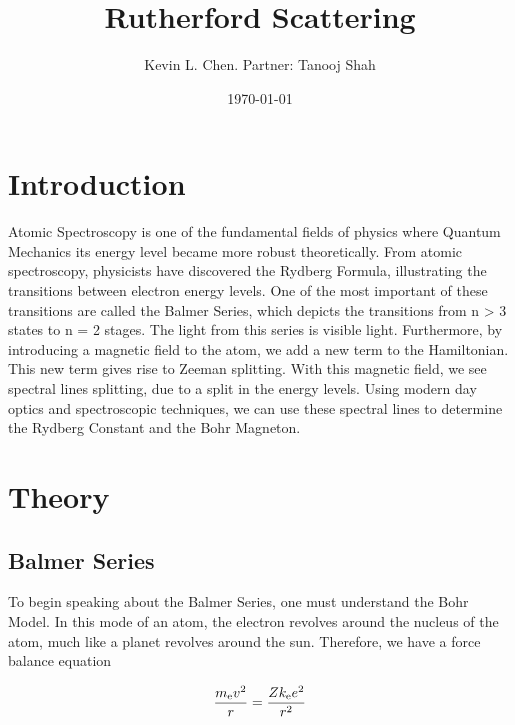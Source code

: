 \title{Rutherford Scattering}
\author         {Kevin L. Chen. Partner: Tanooj Shah}
\date{\today}

\begin{abstract}
\end{abstract}

\maketitle

\section{Introduction}

Atomic Spectroscopy is one of the fundamental fields of physics where Quantum Mechanics its energy level became more robust theoretically. From atomic spectroscopy, physicists have discovered the Rydberg Formula, illustrating the transitions between electron energy levels. One of the most important of these transitions are called the Balmer Series, which depicts the transitions from n > 3 states to n = 2 stages. The light from this series is visible light. Furthermore, by introducing a magnetic field to the atom, we add a new term to the Hamiltonian. This new term gives rise to Zeeman splitting. With this magnetic field, we see spectral lines splitting, due to a split in the energy levels. Using modern day optics and spectroscopic techniques, we can use these spectral lines to determine the Rydberg Constant and the Bohr Magneton. 
\section{Theory}
\subsection{Balmer Series}

To begin speaking about the Balmer Series, one must understand the Bohr Model. In this mode of an atom, the electron revolves around the nucleus of the atom, much like a planet revolves around the sun. Therefore, we have a force balance equation 

\begin{equation}
    {m_\mathrm{e} v^2\over r} = {Zk_\mathrm{e} e^2 \over r^2} 
   \label{Coulomb Force}
\end{equation}

